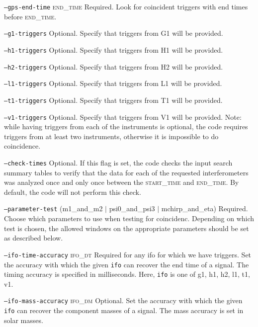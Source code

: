\begin{entry}
\begin{entry}
\item[\texttt{--gps-end-time} \textsc{end\_time}] Required.  Look for
coincident triggers with end times before \textsc{end\_time}.


\item[\texttt{--g1-triggers}] Optional.  Specify that triggers from G1 will be
provided.

\item[\texttt{--h1-triggers}] Optional.  Specify that triggers from H1 will be
provided.
\item[\texttt{--h2-triggers}] Optional.  Specify that triggers from H2 will be
provided.

\item[\texttt{--l1-triggers}] Optional.  Specify that triggers from L1 will be
provided.
\item[\texttt{--t1-triggers}] Optional.  Specify that triggers from T1 will be
provided.
\item[\texttt{--v1-triggers}] Optional.  Specify that triggers from V1 will be
provided.  Note: while having triggers from each of the instruments is
optional, the code requires triggers from at least two instruments, otherwise
it is impossible to do coincidence.

\item[\texttt{--check-times}] Optional.  If this flag is set, the code checks
the input search summary tables to verify that the data for each of the
requested interferometers was analyzed once and only once between the
\textsc{start\_time} and \textsc{end\_time}.  By default, the code will not
perform this check.

\item[\texttt{--parameter-test}
(m1\_and\_m2 $\mid$ psi0\_and\_psi3 $\mid$ mchirp\_and\_eta)]
Required. Choose which parameters to use when testing for coincidenc.
Depending on which test is chosen, the allowed windows on the appropriate
parameters should be set as described below.

\item[\texttt{--ifo-time-accuracy} \textsc{ifo\_dt}] Required for any ifo for
which we have triggers. Set the accuracy with which the given \texttt{ifo} can
recover the end time of a signal.  The timing accuracy is specified in
milliseconds. Here, \texttt{ifo} is one of g1, h1, h2, l1, t1, v1.

\item[\texttt{--ifo-mass-accuracy} \textsc{ifo\_dm}] Optional. Set the
accuracy with which the given \texttt{ifo} can recover the component masses of
a signal.  The mass accuracy is set in solar masses.


\end{entry}
\end{entry}
